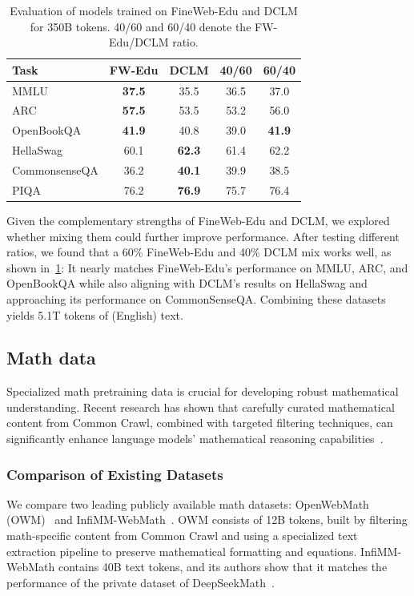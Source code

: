 \documentclass{article}
\theoremstyle{plain}
\theoremstyle{definition}
\theoremstyle{remark}
\begin{document}
\begin{table}[t]
\caption{Evaluation of models trained on FineWeb-Edu and DCLM for 350B tokens. 40/60 and 60/40 denote the FW-Edu/DCLM ratio.}
\vspace{0.5em}
\label{tab:web-data-ablations}
\centering
\small
\begin{tabular}{@{}lcccc@{}}
\toprule
\textbf{Task} & \textbf{FW-Edu} & \textbf{DCLM} & \textbf{40/60} & \textbf{60/40}  \\
\midrule
MMLU            & \textbf{37.5} & 35.5 & 36.5 & 37.0 \\
ARC             & \textbf{57.5} & 53.5 & 53.2 & 56.0 \\
OpenBookQA      & \textbf{41.9} & 40.8 & 39.0 & \textbf{41.9} \\
HellaSwag       & 60.1 & \textbf{62.3} & 61.4 & 62.2 \\
CommonsenseQA   & 36.2 & \textbf{40.1} & 39.9 & 38.5 \\
PIQA            & 76.2 & \textbf{76.9} & 75.7 & 76.4 \\
\bottomrule
\end{tabular}
\vspace{-1em}
\end{table}

Given the complementary strengths of FineWeb-Edu and DCLM, we explored whether mixing them could further improve performance. After testing different ratios, we found that a 60\% FineWeb-Edu and 40\% DCLM mix works well, as shown in~\cref{tab:web-data-ablations}: It nearly matches FineWeb-Edu's performance on MMLU, ARC, and OpenBookQA while also aligning with DCLM's results on HellaSwag and approaching its performance on CommonSenseQA.
Combining these datasets yields 5.1T tokens of (English) text.

\subsection{Math data}
\label{sec:math-datasets}
Specialized math pretraining data is crucial for developing robust mathematical understanding.
Recent research has shown that carefully curated mathematical content from Common Crawl, combined with targeted filtering techniques, can significantly enhance language models' mathematical reasoning capabilities~\cite{dubey2024llama,yang2024qwen2,shao2024deepseekmath,han2024infimm}.

\subsubsection{Comparison of Existing Datasets}
We compare two leading publicly available math datasets: OpenWebMath (OWM)~\cite{paster2023openwebmath} and InfiMM-WebMath~\cite{han2024infimm}.
OWM consists of 12B tokens, built by filtering math-specific content from Common Crawl and using a specialized text extraction pipeline to preserve mathematical formatting and equations.
InfiMM-WebMath contains 40B text tokens, and its authors show that it matches the performance of the private dataset of DeepSeekMath~\citep{shao2024deepseekmath}.
\end{document}
